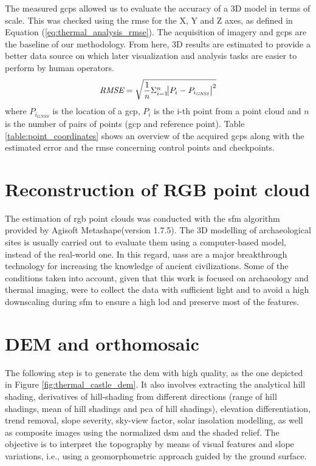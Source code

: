 The measured \acrshort{gcp}s allowed us to evaluate the accuracy of a 3D model in terms of scale. This was checked using the \acrshort{rmse} for the X, Y and Z axes, as defined in Equation (\ref{eq:thermal_analysis_rmse}). The acquisition of imagery and \acrshort{gcp}s are the baseline of our methodology. From here, 3D results are estimated to provide a better data source on which later visualization and analysis tasks are easier to perform by human operators.
\begin{equation}
\label{eq:thermal_analysis_rmse}
\textit{RMSE} = \sqrt{\frac{1}{n}\Sigma_{i=1}^{n}{\abs{P_{i} - P_{{i_{\textit{GNSS}}}}}^2}}
\end{equation}
where $P_{i_{\textit{GNSS}}}$ is the location of a \acrshort{gcp}, $P_{i}$ is the i-th point from a point cloud and $n$ is the number of pairs of points (\acrshort{gcp} and reference point). Table \ref{table:point_coordinates} shows an overview of the acquired \acrshort{gcp}s along with the estimated error and the \acrshort{rmse} concerning control points and checkpoints.

\section{Reconstruction of RGB point cloud}

The estimation of \acrshort{rgb} point clouds was conducted with the \acrshort{sfm} algorithm provided by Agisoft Metashape\textregistered (version 1.7.5). The 3D modelling of archaeological sites is usually carried out to evaluate them using a computer-based model, instead of the real-world one. In this regard, \acrshort{uas}s are a major breakthrough technology for increasing the knowledge of ancient civilizations. Some of the conditions taken into account, given that this work is focused on archaeology and thermal imaging, were to collect the data with sufficient light and to avoid a high downscaling during \acrshort{sfm} to ensure a high \acrshort{lod} and preserve most of the features.

\section{DEM and orthomosaic}

The following step is to generate the \acrshort{dem} with high quality, as the one depicted in Figure \ref{fig:thermal_castle_dem}. It also involves extracting the analytical hill shading, derivatives of hill-shading from different directions (range of hill shadings, mean of hill shadings and \acrshort{pca} of hill shadings), elevation differentiation, trend removal, slope severity, sky-view factor, solar insolation modelling, as well as composite images using the normalized \acrshort{dsm} and the shaded relief. The objective is to interpret the topography by means of visual features and slope variations, i.e., using a geomorphometric approach guided by the ground surface. 

